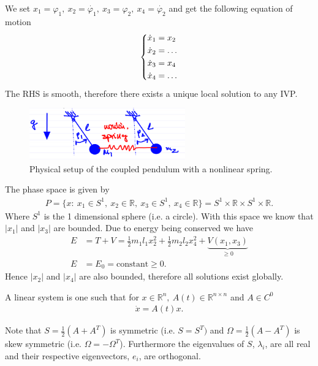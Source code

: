 \begin{ex}
	We set $x_1 = \varphi_1,\ x_2 = \dot{\varphi_1},\ x_3 = \varphi_2,\ x_4=\dot{\varphi_2} $ and get the following equation of motion
\begin{align}
	\begin{dcases}
		\dot{x}_1 = x_2 \\ \dot{x}_2 = \ldots \\ \dot{x}_3 = x_4 \\ \dot{x}_4 = \ldots
	\end{dcases}
\end{align}
The RHS is smooth, therefore there exists a unique local solution to any IVP.
\begin{figure}[h]
	\centering
	\includegraphics[width=0.6\textwidth]{figures/ch1/6coupled_pendulum.png}
	\caption{Physical setup of the coupled pendulum with a nonlinear spring.}
\end{figure}
The phase space is given by 
\begin{align}
	P = \{x:\ x_1 \in S^1,\ x_2 \in \mathbb{R},\ x_3 \in S^1,\ x_4 \in \mathbb{R} \} = S^1 \times \mathbb{R}\times S^1 \times \mathbb{R}.
\end{align}
Where $S^1$ is the 1 dimensional sphere (i.e. a circle). With this space we know that $|x_1|$ and $|x_3|$ are bounded. Due to energy being conserved we have
\begin{align}
	E &= T+V = \frac{1}{2}m_1 l_1 x_2^2 + \frac{1}{2}m_2 l_2 x_4^2 + \underbrace{V(x_1, x_3)}_{\geq 0}\\
	E &= E_0 =  \textrm{constant} \geq 0.
\end{align}
Hence $|x_2|$ and $|x_4|$ are also bounded, therefore all solutions exist globally.
\end{ex}
\begin{definition}
	A linear system is one such that for $x\in \mathbb{R}^{n},\ A(t) \in \mathbb{R}^{n\times n}$ and $A\in C^0$ 
	\begin{align}
		\boxed{\dot{x} = A(t) x.}
	\end{align}
\end{definition}

\begin{remark}[]
	Note that  $S = \frac{1}{2}(A + A^T)$ is symmetric (i.e. $S = S^T)$ and $\Omega = \frac{1}{2}(A - A^T)$ is skew symmetric (i.e. $\Omega = -\Omega^T$). Furthermore the eigenvalues of $S$, $\lambda_i$, are all real and their respective eigenvectors, $e_i$, are orthogonal.
\end{remark}

